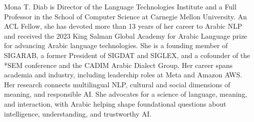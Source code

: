 Mona T. Diab is Director of the Language Technologies Institute and a Full Professor in the School of Computer Science at Carnegie Mellon University. An ACL Fellow, she has devoted more than 13 years of her career to Arabic NLP and received the 2023 King Salman Global Academy for Arabic Language prize for advancing Arabic language technologies. She is a founding member of SIGARAB, a former President of SIGDAT and SIGLEX, and a cofounder of the *SEM conference and the CADIM Arabic Dialect Group. Her career spans academia and industry, including leadership roles at Meta and Amazon AWS. Her research connects multilingual NLP, cultural and social dimensions of meaning, and responsible AI. She advocates for a science of language, meaning, and interaction, with Arabic helping shape foundational questions about intelligence, understanding, and trustworthy AI.
